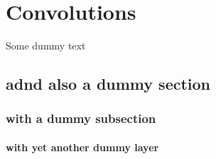 \chapter{Convolutions}
\label{chap:conv}

Some dummy text

\section{adnd also a dummy section }

\subsection{with a dummy subsection}

\subsubsection{with yet another dummy layer}
